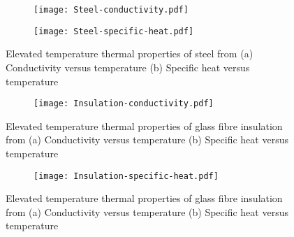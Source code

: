 \begin{figure}[!htbp]
	\centering
	\begin{subfigure}[b]{0.6\textwidth}
		\centering
		\texttt{[image: Steel-conductivity.pdf]}
		\caption{}
		\label{subfig:Steel-conductivity}
	\end{subfigure}
	\begin{subfigure}[b]{0.6\textwidth}
		\centering
		\texttt{[image: Steel-specific-heat.pdf]}
		\caption{}
		\label{subfig:Steel-specific-heat}
	\end{subfigure}
	   \caption{Elevated temperature thermal properties of steel from \citet{Maneesha2018} (a) Conductivity versus temperature (b) Specific heat versus temperature}
	   \label{fig:Steel-thermal}
\end{figure}
\begin{figure}[!htbp]
	\centering
	\begin{subfigure}[b]{0.6\textwidth}
		\centering
		\texttt{[image: Insulation-conductivity.pdf]}
		\caption{}
		\label{subfig:Insulation-conductivity}
	\end{subfigure}
	\caption{Elevated temperature thermal properties of glass fibre insulation from \citet{Maneesha2018} (a) Conductivity versus temperature (b) Specific heat versus temperature}
	   \label{fig:Insulation-thermal-a}
\end{figure}
\begin{figure}[!htbp]
	\ContinuedFloat
	\centering
	\begin{subfigure}[b]{0.6\textwidth}
		\centering
		\texttt{[image: Insulation-specific-heat.pdf]}
		\caption{}
		\label{subfig:Insulation-specific-heat}
	\end{subfigure}
	\caption{Elevated temperature thermal properties of glass fibre insulation from \citet{Maneesha2018} (a) Conductivity versus temperature (b) Specific heat versus temperature}
	   \label{fig:Insulation-thermal}
\end{figure}

